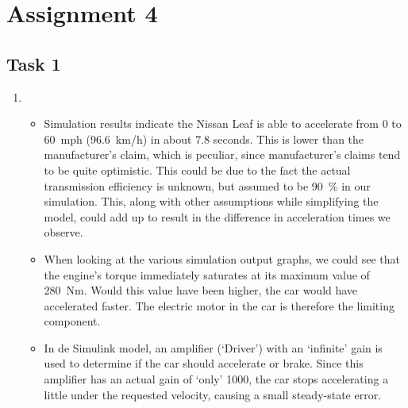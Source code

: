 \documentclass[11pt,titlepage]{report}
\begin{document}
\chapter{Assignment 4}
\section{Task 1}

\begin{enumerate}
\item
	\begin{itemize}
		\item
		Simulation results indicate the Nissan Leaf is able to accelerate from \num{0} to \SI{60}{mph} (\SI{96.6}{km/h}) in about \num{7.8} seconds. This is lower than the manufacturer's claim, which is peculiar, since manufacturer's claims tend to be quite optimistic. This could be due to the fact the actual transmission efficiency is unknown, but assumed to be \SI{90}{\percent} in our simulation. This, along with other assumptions while simplifying the model, could add up to result in the difference in acceleration times we observe.

		\item
		When looking at the various simulation output graphs, we could see that the engine's torque immediately saturates at its maximum value of \SI{280}{Nm}. Would this value have been higher, the car would have accelerated faster. The electric motor in the car is therefore the limiting component.

		\item
		In de Simulink model, an amplifier (`Driver') with an `infinite' gain is used to determine if the car should accelerate or brake. Since this amplifier has an actual gain of `only' \num{1000}, the car stops accelerating a little under the requested velocity, causing a small steady-state error.
	\end{itemize}


\end{enumerate}
\end{document}
